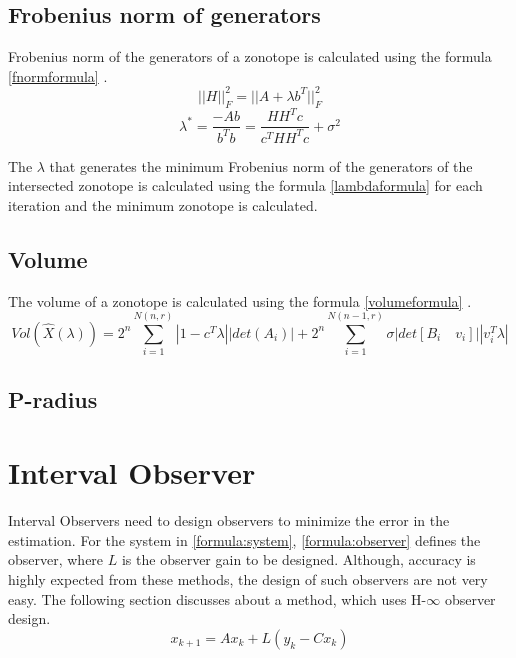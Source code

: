 \subsection{Frobenius norm of generators}
Frobenius norm of the generators of a zonotope is calculated using the formula \eqref{fnormformula} \cite{Alamo2005}.
\begin{equation}
\label{fnormformula}
||H||_{F}^2 = ||A + \lambda b^T||^{2}_F
\end{equation}
\begin{equation}
\label{lambdaformula}
\lambda^* = \frac{-Ab }{b^Tb}  = \frac{HH^Tc}{c^T HH^Tc} + \sigma^2
\end{equation}

The $\lambda$ that generates the minimum Frobenius norm of the generators of the intersected zonotope is calculated using the formula \eqref{lambdaformula} for each iteration and the minimum zonotope is calculated.

\subsection{Volume}
The volume of a zonotope is calculated using the formula \eqref{volumeformula} \cite{Alamo2005}.
\begin{equation}
\label{volumeformula}
Vol(\hat{X}(\lambda)) = 2^n \sum^{N(n,r)}_{i=1} |1- c^T \lambda||det(A_i)| + 2^n \sum^{N(n-1,r)}_{i=1} \sigma|det[B_i \quad v_i]||v_i^T\lambda|
\end{equation}

\subsection{P-radius}


\section{Interval Observer}
Interval Observers need to design observers to minimize the error in the estimation. For the system in \eqref{formula:system}, \eqref{formula:observer} defines the observer, where $L$ is the observer gain to be designed. Although, accuracy is highly expected from these methods, the design of such observers are not very easy. The following section discusses about a method, which uses H-$\infty$ observer design.
\begin{equation}
\label{formula:observer}
x_{k+1} = Ax_k + L(y_k -Cx_k)
\end{equation}

